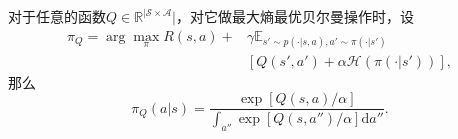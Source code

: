 \begin{lemma}
    对于任意的函数$Q\in\mathbb{R}^{\vert \mathcal{S} \times \mathcal{A}}\vert$，对它做最大熵最优贝尔曼操作时，设
    \begin{equation}
        \begin{aligned}
        \pi_Q = \arg\max_{\pi} R(s, a) + & \gamma \mathbb{E}_{s' \sim p(\cdot \vert s, a), a' \sim \pi(\cdot \vert s')} \\
        & [Q(s', a') + \alpha \mathcal{H}(\pi(\cdot \vert s')) ],
        \end{aligned}
    \end{equation}
    那么
    \begin{equation}
        \pi_Q(a \vert s) = \frac{\exp[Q(s, a)/\alpha]}{\int_{a''} \exp [Q(s, a'')/\alpha] \mathrm{d} a''}.
    \end{equation}
\end{lemma}
